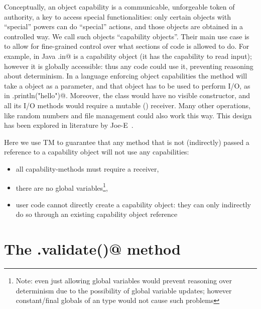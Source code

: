 Conceptually, an object capability is a communicable, unforgeable token of authority, a key to access special functionalities: only certain objects with ``special'' powers can do ``special'' actions, and those objects are obtained in a controlled way. We call such objects ``capability objects''.
Their main use case is to allow for fine-grained control over what sections of code is allowed to do. For example, in Java \Q@System.in@ is a capability object (it has the capability to read input); however it is globally accessible: thus any code could use it, preventing reasoning about determinism.
In a language enforcing object capabilities the \Q@main@ method will take a \Q@System@ object as a parameter, and that object has to be used to perform I/O, as in \Q@mySystem.println("hello")@.
Moreover, the \Q@System@ class would have no visible constructor, and all its I/O methods would require a mutable (\Q@mut@) receiver.
Many other operations, like random numbers and file management 
could also work this way.
\noindent This design has been explored in literature by Joe-E~\cite{finifter2008verifiable}.

Here we use TM to guarantee that any method that is not (indirectly) passed a \Q@mut@ reference to a capability object will not use any capabilities:
\begin{itemize}
\item all capability-methods must require a \Q@mut@ receiver,
\item there are no global variables\footnote{Note: even just allowing \Q@imm@
global variables would prevent reasoning over determinism due to the possibility of global variable updates; however constant/final globals of an \Q@imm@ type would not cause such problems},
\item user code cannot directly create a capability object: they can only indirectly do so through an existing \Q@mut@ capability object reference

\end{itemize}






\section{The \Q@.validate()@ method}

